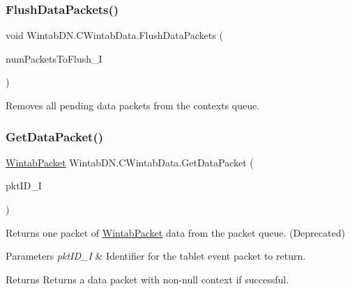 \subsubsection{\texorpdfstring{Flush\+Data\+Packets()}{FlushDataPackets()}}
{\footnotesize\ttfamily void Wintab\+D\+N.\+C\+Wintab\+Data.\+Flush\+Data\+Packets (\begin{DoxyParamCaption}\item[{uint}]{num\+Packets\+To\+Flush\+\_\+I }\end{DoxyParamCaption})\hspace{0.3cm}{\ttfamily [inline]}}



Removes all pending data packets from the context\textquotesingle{}s queue. 

\mbox{\label{class_wintab_d_n_1_1_c_wintab_data_a2c117ceaa2a2db38f99e47549897b6d5}} 
\subsubsection{\texorpdfstring{Get\+Data\+Packet()}{GetDataPacket()}\hspace{0.1cm}{\footnotesize\ttfamily [1/2]}}
{\footnotesize\ttfamily \mbox{\hyperlink{struct_wintab_d_n_1_1_wintab_packet}{Wintab\+Packet}} Wintab\+D\+N.\+C\+Wintab\+Data.\+Get\+Data\+Packet (\begin{DoxyParamCaption}\item[{U\+Int32}]{pkt\+I\+D\+\_\+I }\end{DoxyParamCaption})\hspace{0.3cm}{\ttfamily [inline]}}



Returns one packet of \mbox{\hyperlink{struct_wintab_d_n_1_1_wintab_packet}{Wintab\+Packet}} data from the packet queue. (Deprecated) 


\begin{DoxyParams}{Parameters}
{\em pkt\+I\+D\+\_\+I} & Identifier for the tablet event packet to return.\\
\hline
\end{DoxyParams}
\begin{DoxyReturn}{Returns}
Returns a data packet with non-\/null context if successful.
\end{DoxyReturn}
\mbox{\label{class_wintab_d_n_1_1_c_wintab_data_a13dd62c752065f17025bf804a22d8cbf}} 
